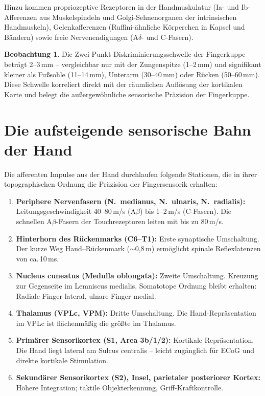 ﻿\documentclass[12pt,a4paper]{report}
\theoremstyle{plain}
\theoremstyle{definition}
\newtheorem{beobachtung}[theorem]{Beobachtung}
\theoremstyle{remark}
\begin{document}
Hinzu kommen propriozeptive Rezeptoren in der Handmuskulatur
(Ia- und Ib-Afferenzen aus Muskelspindeln und Golgi-Sehnenorganen der
intrinsischen Handmuskeln), Gelenkafferenzen (Ruffini-ähnliche Körperchen
in Kapsel und Bändern) sowie freie Nervenendigungen (A$\delta$- und C-Fasern).

\begin{beobachtung}
Die Zwei-Punkt-Diskriminierungsschwelle der Fingerkuppe beträgt
2--3\,mm -- vergleichbar nur mit der Zungenspitze (1--2\,mm) und
signifikant kleiner als Fußsohle (11--14\,mm), Unterarm (30--40\,mm)
oder Rücken (50--60\,mm). Diese Schwelle korreliert direkt mit der
räumlichen Auflösung der kortikalen Karte und belegt die
außergewöhnliche sensorische Präzision der Fingerkuppe.
\end{beobachtung}

\section{Die aufsteigende sensorische Bahn der Hand}

Die afferenten Impulse aus der Hand durchlaufen folgende Stationen,
die in ihrer topographischen Ordnung die Präzision der Fingersensorik
erhalten:

\begin{enumerate}
\item \textbf{Periphere Nervenfasern (N.\ medianus, N.\ ulnaris, N.\ radialis):}
  Leitungsgeschwindigkeit 40--80\,m/s (A$\beta$) bis 1--2\,m/s (C-Fasern).
  Die schnellen A$\beta$-Fasern der Touchrezeptoren leiten mit bis zu 80\,m/s.
\item \textbf{Hinterhorn des Rückenmarks (C6--T1):} Erste synaptische
  Umschaltung. Der kurze Weg Hand--Rückenmark ($\sim$0{,}8\,m) ermöglicht
  spinale Reflexlatenzen von ca.\,10\,ms.
\item \textbf{Nucleus cuneatus (Medulla oblongata):} Zweite Umschaltung.
  Kreuzung zur Gegenseite im Lemniscus medialis. Somatotope Ordnung bleibt
  erhalten: Radiale Finger lateral, ulnare Finger medial.
\item \textbf{Thalamus (VPLc, VPM):} Dritte Umschaltung. Die Hand-Repräsentation
  im VPLc ist flächenmäßig die größte im Thalamus.
\item \textbf{Primärer Sensorikortex (S1, Area 3b/1/2):} Kortikale Repräsentation.
  Die Hand liegt lateral am Sulcus centralis -- leicht zugänglich für
  ECoG und direkte kortikale Stimulation.
\item \textbf{Sekundärer Sensorikortex (S2), Insel, parietaler posteriorer Kortex:}
  Höhere Integration; taktile Objekterkennung, Griff-Kraftkontrolle.
\end{enumerate}
\end{document}
